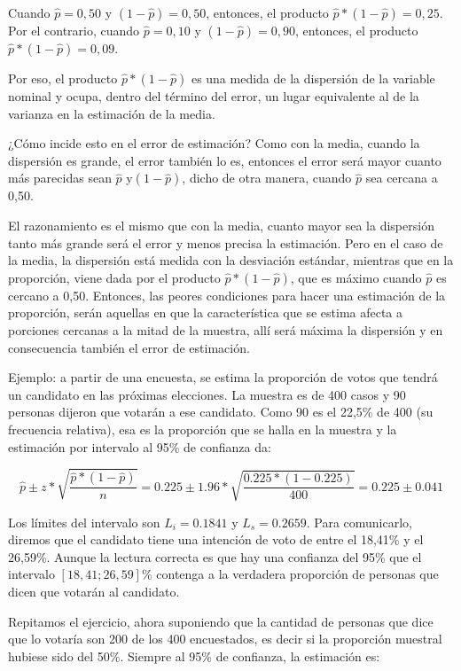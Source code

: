 \documentclass[]{book}
\begin{document}
Cuando \(\widehat{p} = 0,50\) y \(( 1 - \widehat{p}) = 0,50\), entonces, el producto \(\widehat{p}*(1 - \widehat{p}) = 0,25\). Por el contrario, cuando \(\widehat{p} = 0,10\) y \(( 1 - \widehat{p}) = 0,90\), entonces, el producto \(\widehat{p}*( 1 - \widehat{p}) = 0,09\).

Por eso, el producto \(\widehat{p}*( 1 - \widehat{p})\) es una medida de la dispersión de la variable nominal y ocupa, dentro del término del error, un lugar equivalente al de la varianza en la estimación de la media.

¿Cómo incide esto en el error de estimación? Como con la media, cuando la dispersión es grande, el error también lo es, entonces el error será mayor cuanto más parecidas sean \(\widehat{p}\) y\(( 1 - \widehat{p})\), dicho de otra manera, cuando \(\widehat{p}\) sea cercana a 0,50.

El razonamiento es el mismo que con la media, cuanto mayor sea la
dispersión tanto más grande será el error y menos precisa la estimación.
Pero en el caso de la media, la dispersión está medida con la desviación
estándar, mientras que en la proporción, viene dada por el producto
\(\widehat{p}*( 1 - \widehat{p})\), que es máximo cuando
\(\widehat{p}\) es cercano a 0,50. Entonces, las peores condiciones para
hacer una estimación de la proporción, serán aquellas en que la
característica que se estima afecta a porciones cercanas a la mitad de
la muestra, allí será máxima la dispersión y en consecuencia también el
error de estimación.

Ejemplo: a partir de una encuesta, se estima la proporción de votos que
tendrá un candidato en las próximas elecciones. La muestra es de 400
casos y 90 personas dijeron que votarán a ese candidato. Como 90 es el
22,5\% de 400 (su frecuencia relativa), esa es la proporción que se halla
en la muestra y la estimación por intervalo al 95\% de confianza da:

\[\widehat{p} \pm z*\sqrt{\frac{\widehat{p}*(1 - \widehat{p})}{n}} = 0.225 \pm 1.96*\sqrt{\frac{0.225*(1 - 0.225)}{400}} = 0.225 \pm 0.041\]

Los límites del intervalo son \(L_i = 0.1841\) y \(L_s = 0.2659\). Para
comunicarlo, diremos que el candidato tiene una intención de voto de
entre el 18,41\% y el 26,59\%. Aunque la lectura correcta es que hay una
confianza del 95\% que el intervalo \([18,41; 26,59]\)\% contenga a la
verdadera proporción de personas que dicen que votarán al candidato.

Repitamos el ejercicio, ahora suponiendo que la cantidad de personas que
dice que lo votaría son 200 de los 400 encuestados, es decir si la
proporción muestral hubiese sido del 50\%. Siempre al 95\% de confianza,
la estimación es:
\end{document}
